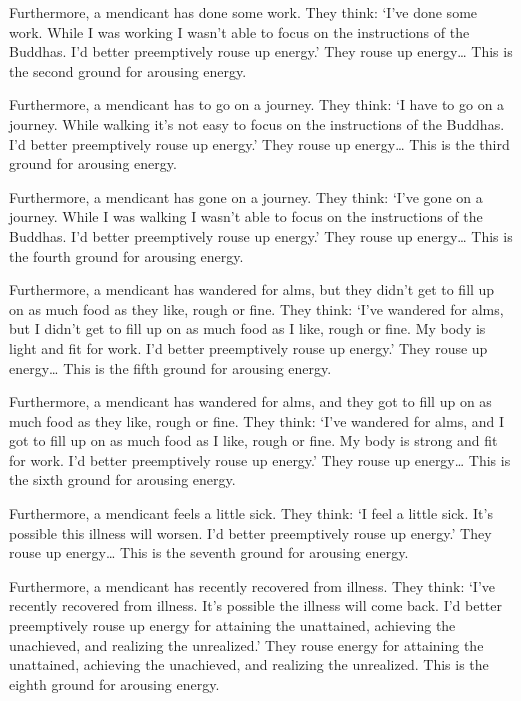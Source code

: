 \documentclass[12pt,openany]{book}%
\begin{document}
Furthermore, a mendicant has done some work. They think: ‘I’ve done some work. While I was working I wasn’t able to focus on the instructions of the Buddhas. I’d better preemptively rouse up energy.’ They rouse up energy… This is the second ground for arousing energy. 

Furthermore, a mendicant has to go on a journey. They think: ‘I have to go on a journey. While walking it’s not easy to focus on the instructions of the Buddhas. I’d better preemptively rouse up energy.’ They rouse up energy… This is the third ground for arousing energy. 

Furthermore, a mendicant has gone on a journey. They think: ‘I’ve gone on a journey. While I was walking I wasn’t able to focus on the instructions of the Buddhas. I’d better preemptively rouse up energy.’ They rouse up energy… This is the fourth ground for arousing energy. 

Furthermore, a mendicant has wandered for alms, but they didn’t get to fill up on as much food as they like, rough or fine. They think: ‘I’ve wandered for alms, but I didn’t get to fill up on as much food as I like, rough or fine. My body is light and fit for work. I’d better preemptively rouse up energy.’ They rouse up energy… This is the fifth ground for arousing energy. 

Furthermore, a mendicant has wandered for alms, and they got to fill up on as much food as they like, rough or fine. They think: ‘I’ve wandered for alms, and I got to fill up on as much food as I like, rough or fine. My body is strong and fit for work. I’d better preemptively rouse up energy.’ They rouse up energy… This is the sixth ground for arousing energy. 

Furthermore, a mendicant feels a little sick. They think: ‘I feel a little sick. It’s possible this illness will worsen. I’d better preemptively rouse up energy.’ They rouse up energy… This is the seventh ground for arousing energy. 

Furthermore, a mendicant has recently recovered from illness. They think: ‘I’ve recently recovered from illness. It’s possible the illness will come back. I’d better preemptively rouse up energy for attaining the unattained, achieving the unachieved, and realizing the unrealized.’ They rouse energy for attaining the unattained, achieving the unachieved, and realizing the unrealized. This is the eighth ground for arousing energy. 
\end{document}
